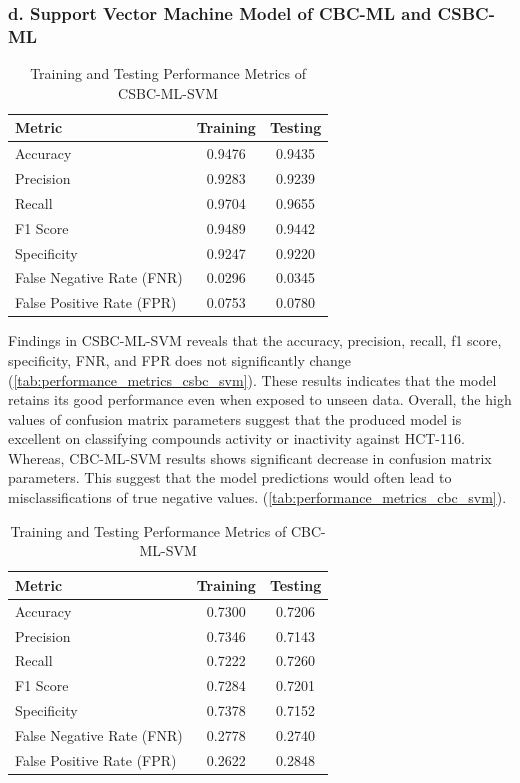 \subsubsection*{d. Support Vector Machine Model of CBC-ML and CSBC-ML}

\begin{table}[h]
\centering
\small
\renewcommand{\arraystretch}{1.2} %

\begin{tabular}{l c c}
\hline
\textbf{Metric} & \textbf{Training} & \textbf{Testing} \\
\hline
Accuracy & 0.9476 & 0.9435 \\
Precision & 0.9283 & 0.9239 \\
Recall & 0.9704 & 0.9655 \\
F1 Score & 0.9489 & 0.9442 \\
Specificity & 0.9247 & 0.9220 \\
False Negative Rate (FNR) & 0.0296 & 0.0345 \\
False Positive Rate (FPR) & 0.0753 & 0.0780 \\
\hline
\end{tabular}

\caption{Training and Testing Performance Metrics of CSBC-ML-SVM}
\label{tab:performance_metrics_csbc_svm}
\end{table}


Findings in CSBC-ML-SVM reveals that the accuracy, precision, recall, f1 score, specificity, FNR, and FPR does not significantly change (\autoref{tab:performance_metrics_csbc_svm}). These results indicates that the model retains its good performance even when exposed to unseen data. Overall, the high values of confusion matrix parameters suggest that the produced model is excellent on classifying compounds activity or inactivity against HCT-116. Whereas, CBC-ML-SVM results shows significant decrease in confusion matrix parameters. This suggest that the model predictions would often lead to misclassifications of true negative values. (\autoref{tab:performance_metrics_cbc_svm}).   
\vspace{-0.5cm}
\begin{table}[h]
\centering
\small
\renewcommand{\arraystretch}{1.2} %

\begin{tabular}{l c c}
\hline
\textbf{Metric} & \textbf{Training} & \textbf{Testing} \\
\hline
Accuracy & 0.7300 & 0.7206 \\
Precision & 0.7346 & 0.7143 \\
Recall & 0.7222 & 0.7260 \\
F1 Score & 0.7284 & 0.7201 \\
Specificity & 0.7378 & 0.7152 \\
False Negative Rate (FNR) & 0.2778 & 0.2740 \\
False Positive Rate (FPR) & 0.2622 & 0.2848 \\
\hline
\end{tabular}
\caption{Training and Testing Performance Metrics of CBC-ML-SVM}
\label{tab:performance_metrics_cbc_svm}
\end{table}

